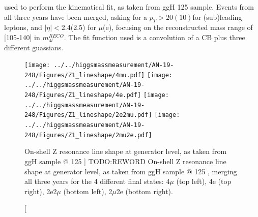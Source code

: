 used to perform the kinematical fit, as taken from ggH 125 \GeV sample. 
Events from all three years have been merged, asking for a 
$p_T > 20(10)$\GeV for (sub)leading leptons, and $|\eta|<$2.4(2.5) for $\mu$(e), focusing on
the reconstructed mass range of [105-140] \GeV in $m_{4l}^{RECO}$. The fit function used is a convolution
of a CB plus three different guassians.
\begin{figure}[!htbp]
\begin{center}
	\texttt{[image: ../../higgsmassmeasurement/AN-19-248/Figures/Z1\_lineshape/4mu.pdf]}
	\texttt{[image: ../../higgsmassmeasurement/AN-19-248/Figures/Z1\_lineshape/4e.pdf]}
  	\texttt{[image: ../../higgsmassmeasurement/AN-19-248/Figures/Z1\_lineshape/2e2mu.pdf]}
	\texttt{[image: ../../higgsmassmeasurement/AN-19-248/Figures/Z1\_lineshape/2mu2e.pdf]}
	\caption
        [On-shell Z resonance line shape at generator level, as taken from ggH sample @ 125 \GeV]
        {TODO:REWORD On-shell Z resonance line shape at generator level, as taken from ggH sample @ 125 \GeV,
        merging all three years for the 4 different final states: 4$\mu$ (top left), 4e (top right), 2e2$\mu$ (bottom left), 2$\mu$2e (bottom right).
        }
\label{fig:Z1_lineshape}
\end{center}
\end{figure}
